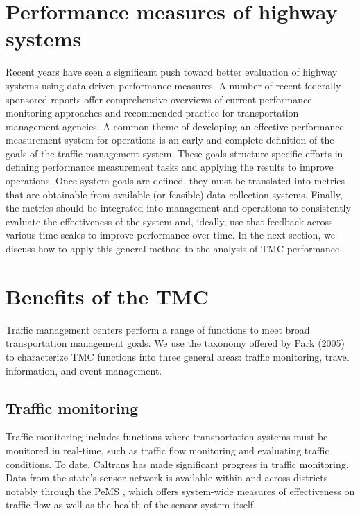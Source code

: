\documentclass[12pt]{report}
\newcounter{time}
\begin{document}

\section{Performance measures of highway systems}
\label{sec:perf-hw-sys}

Recent years have seen a significant push toward better evaluation of
highway systems using data-driven performance measures. A number of
recent federally-sponsored reports offer comprehensive overviews of
current performance monitoring approaches and recommended practice for
transportation management agencies. A common theme of developing an
effective performance measurement system for operations is an early
and complete definition of the goals of the traffic management
system. These goals structure specific efforts in defining performance
measurement tasks and applying the results to improve operations. Once
system goals are defined, they must be translated into metrics that
are obtainable from available (or feasible) data collection systems.
Finally, the metrics should be integrated into management and
operations to consistently evaluate the effectiveness of the system
and, ideally, use that feedback across various time-scales to improve
performance over time. In the next section, we discuss how to apply
this general method to the analysis of \ac{TMC} performance.

\section{Benefits of the TMC}
\label{sec:tmc-bene}

Traffic management centers perform a range of functions to meet broad
transportation management goals. We use the taxonomy offered by Park
(2005) to characterize \ac{TMC} functions into three general areas: traffic
monitoring, travel information, and event management.

\subsection{Traffic monitoring}
\label{sec:traf-mon}

Traffic monitoring includes functions where transportation systems
must be monitored in real-time, such as traffic flow monitoring and
evaluating traffic conditions. To date, Caltrans has made significant
progress in traffic monitoring. Data from the state's sensor network
is available within and across districts---notably through the
\acf{PeMS} \citep{choe02:_freew_perfor_measur_system_pems}, which
offers system-wide measures of effectiveness on traffic flow as well
as the health of the sensor system itself.
\end{document}
